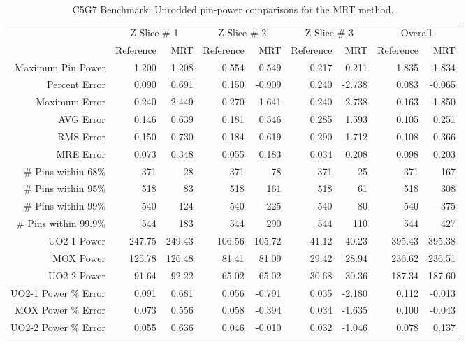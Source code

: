 {{{{        \begin{table}[htbp]
          \centering
          \caption{C5G7 Benchmark: Unrodded pin-power comparisons for the MRT method. \label{tab:MR:C5G7:Rodded B-MRT}}
          \scriptsize
          \begin{tabular}{rrrrrrrrr}\toprule
                                  & \multicolumn{2}{c}{Z Slice \# 1} & \multicolumn{2}{c}{Z Slice \# 2} & \multicolumn{2}{c}{Z Slice \# 3} & \multicolumn{2}{c}{Overall}\\
                                  & Reference & MRT & Reference & MRT & Reference & MRT & Reference & MRT\\\midrule
            Maximum Pin Power     & 1.200 & 1.208 & 0.554 & 0.549 & 0.217 & 0.211 & 1.835 & 1.834\\
            Percent Error         & 0.090 & 0.691 & 0.150 & -0.909 & 0.240 & -2.738 & 0.083 & -0.065\\\midrule
            Maximum Error         & 0.240 & 2.449 & 0.270 & 1.641 & 0.240 & 2.738 & 0.163 & 1.850\\
            AVG Error             & 0.146 & 0.639 & 0.181 & 0.546 & 0.285 & 1.593 & 0.105 & 0.251\\
            RMS Error             & 0.150 & 0.730 & 0.184 & 0.619 & 0.290 & 1.712 & 0.108 & 0.366\\
            MRE Error             & 0.073 & 0.348 & 0.055 & 0.183 & 0.034 & 0.208 & 0.098 & 0.203\\\midrule
            \# Pins within 68\%   & 371 & 28 & 371 & 78 & 371 & 25 & 371 & 167\\
            \# Pins within 95\%   & 518 & 83 & 518 & 161 & 518 & 61 & 518 & 308\\
            \# Pins within 99\%   & 540 & 124 & 540 & 225 & 540 & 80 & 540 & 375\\
            \# Pins within 99.9\% & 544 & 183 & 544 & 290 & 544 & 110 & 544 & 427\\\midrule
            UO2-1 Power           & 247.75 & 249.43 & 106.56 & 105.72 & 41.12 & 40.23 & 395.43 & 395.38\\
            MOX Power             & 125.78 & 126.48 & 81.41 & 81.09 & 29.42 & 28.94 & 236.62 & 236.51\\
            UO2-2 Power           & 91.64 & 92.22 & 65.02 & 65.02 & 30.68 & 30.36 & 187.34 & 187.60\\
            UO2-1 Power \% Error  & 0.091 & 0.681 & 0.056 & -0.791 & 0.035 & -2.180 & 0.112 & -0.013\\
            MOX Power \% Error    & 0.073 & 0.556 & 0.058 & -0.394 & 0.034 & -1.635 & 0.100 & -0.043\\
            UO2-2 Power \% Error  & 0.055 & 0.636 & 0.046 & -0.010 & 0.032 & -1.046 & 0.078 & 0.137\\\bottomrule
          \end{tabular}
        \end{table}

}}}}
